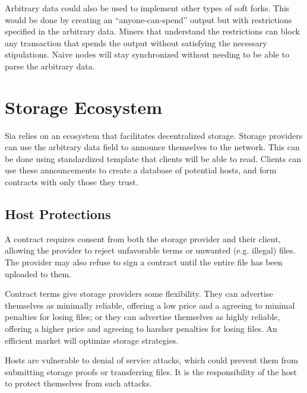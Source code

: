 \documentclass[twocolumn]{article}
\begin{document}
Arbitrary data could also be used to implement other types of soft forks.
This would be done by creating an ``anyone-can-spend'' output but with restrictions specified in the arbitrary data.
Miners that understand the restrictions can block any transaction that spends the output without satisfying the necessary stipulations.
Naive nodes will stay synchronized without needing to be able to parse the arbitrary data.

\section{Storage Ecosystem}
Sia relies on an ecosystem that facilitates decentralized storage.
Storage providers can use the arbitrary data field to announce themselves to the network.
This can be done using standardized template that clients will be able to read.
Clients can use these announcements to create a database of potential hosts, and form contracts with only those they trust.

\subsection{Host Protections}
\label{subsec:host-protect}
A contract requires consent from both the storage provider and their client, allowing the provider to reject unfavorable terms or unwanted (e.g. illegal) files.
The provider may also refuse to sign a contract until the entire file has been uploaded to them.

Contract terms give storage providers some flexibility.
They can advertise themselves as minimally reliable, offering a low price and a agreeing to minimal penalties for losing files;
or they can advertise themselves as highly reliable, offering a higher price and agreeing to harsher penalties for losing files.
An efficient market will optimize storage strategies.

Hosts are vulnerable to denial of service attacks, which could prevent them from submitting storage proofs or transferring files.
It is the responsibility of the host to protect themselves from such attacks.
\end{document}
